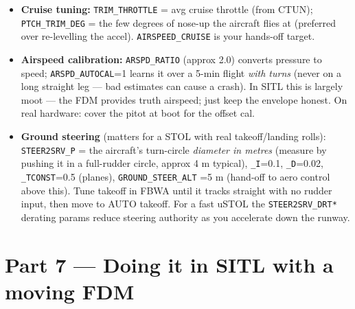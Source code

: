 \documentclass[11pt,a4paper]{article}
\newcommand{\pp}[1]{\texttt{#1}} %
\begin{document}
\begin{itemize}[leftmargin=1.4em]
  \item \textbf{Cruise tuning:} \pp{TRIM\_THROTTLE} = avg cruise throttle (from
  CTUN); \pp{PTCH\_TRIM\_DEG} = the few degrees of nose-up the aircraft flies at
  (preferred over re-levelling the accel). \pp{AIRSPEED\_CRUISE} is your hands-off
  target.
  \item \textbf{Airspeed calibration:} \pp{ARSPD\_RATIO} (approx 2.0) converts
  pressure to speed; \pp{ARSPD\_AUTOCAL}=1 learns it over a 5-min flight \emph{with
  turns} (never on a long straight leg --- bad estimates can cause a crash). In
  SITL this is largely moot --- the FDM provides truth airspeed; just keep the
  envelope honest. On real hardware: cover the pitot at boot for the offset cal.
  \item \textbf{Ground steering} (matters for a STOL with real takeoff/landing
  rolls): \pp{STEER2SRV\_P} = the aircraft's turn-circle \emph{diameter in metres}
  (measure by pushing it in a full-rudder circle, approx 4 m typical),
  \pp{\_I}=0.1, \pp{\_D}=0.02, \pp{\_TCONST}=0.5 (planes), \pp{GROUND\_STEER\_ALT}
  =5 m (hand-off to aero control above this). Tune takeoff in FBWA until it tracks
  straight with no rudder input, then move to AUTO takeoff. For a fast uSTOL the
  \pp{STEER2SRV\_DRT*} derating params reduce steering authority as you accelerate
  down the runway.
\end{itemize}

\section{Part 7 --- Doing it in SITL with a moving FDM}
\end{document}
